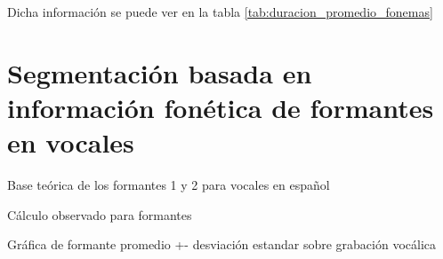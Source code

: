 \documentclass[a4paper,12pt,twoside]{report}
\begin{document}
Dicha información se puede ver en la tabla \ref{tab:duracion_promedio_fonemas}



\section{Segmentación basada en información fonética de formantes en vocales}

Base teórica de los formantes 1 y 2 para vocales en español

Cálculo observado para formantes 

Gráfica de formante promedio +- desviación estandar sobre grabación vocálica


% 
% 

\end{document}
